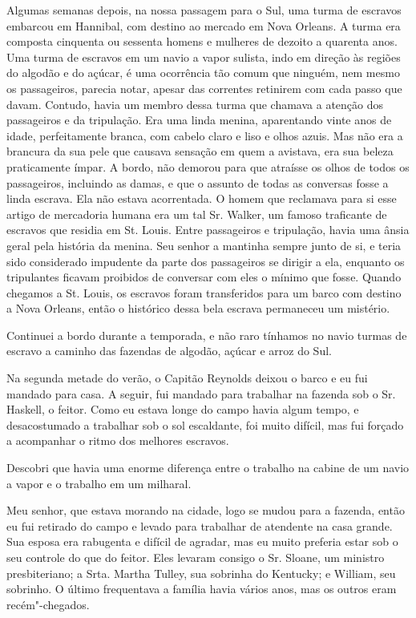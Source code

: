 Algumas semanas depois, na nossa passagem para o Sul, uma turma de
escravos embarcou em Hannibal, com destino ao mercado em Nova Orleans. A
turma era composta cinquenta ou sessenta homens e mulheres de dezoito a %
quarenta anos. Uma turma de escravos em um navio a vapor sulista, indo
em direção às regiões do algodão e do açúcar, é uma ocorrência tão comum
que ninguém, nem mesmo os passageiros, parecia notar, apesar das
correntes retinirem com cada passo que davam. Contudo, havia um membro
dessa turma que chamava a atenção dos passageiros e da tripulação. Era
uma linda menina, aparentando vinte anos de idade, perfeitamente branca,
com cabelo claro e liso e olhos azuis. Mas não era a brancura da sua
pele que causava sensação em quem a avistava, era sua beleza
praticamente ímpar. A bordo, não demorou para que atraísse os olhos de
todos os passageiros, incluindo as damas, e que o assunto de todas as
conversas fosse a linda escrava. Ela não estava acorrentada. O homem que
reclamava para si esse artigo de mercadoria humana era um tal Sr.
Walker, um famoso traficante de escravos que residia em St. Louis. Entre
passageiros e tripulação, havia uma ânsia geral pela história da menina.
Seu senhor a mantinha sempre junto de si, e teria sido considerado
impudente da parte dos passageiros se dirigir a ela, enquanto os
tripulantes ficavam proibidos de conversar com eles o mínimo que fosse.
Quando chegamos a St. Louis, os escravos foram transferidos para um
barco com destino a Nova Orleans, então o histórico dessa bela escrava
permaneceu um mistério.

Continuei a bordo durante a temporada, e não raro tínhamos no navio
turmas de escravo a caminho das fazendas de algodão, açúcar e arroz do
Sul.

Na segunda metade do verão, o Capitão Reynolds deixou o barco e eu fui
mandado para casa. A seguir, fui mandado para trabalhar na fazenda sob o
Sr. Haskell, o feitor. Como eu estava longe do campo havia algum tempo,
e desacostumado a trabalhar sob o sol escaldante, foi muito difícil, mas
fui forçado a acompanhar o ritmo dos melhores escravos.

Descobri que havia uma enorme diferença entre o trabalho na cabine de um
navio a vapor e o trabalho em um milharal.

Meu senhor, que estava morando na cidade, logo se mudou para a fazenda,
então eu fui retirado do campo e levado para trabalhar de atendente na
casa grande. Sua esposa era rabugenta e difícil de agradar, mas eu muito
preferia estar sob o seu controle do que do feitor. Eles levaram consigo
o Sr. Sloane, um ministro presbiteriano; a Srta. Martha Tulley, sua
sobrinha do Kentucky; e William, seu sobrinho. O último frequentava a
família havia vários anos, mas os outros eram recém"-chegados.

